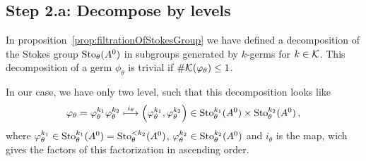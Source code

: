 \subsection{Step 2.a: Decompose by levels}
In proposition~\ref{prop:filtrationOfStokesGroup} we have defined a
decomposition of the Stokes group $\operatorname{Sto}_\theta(A^0)$ in subgroups generated by
$k$-germs for $k\in\mathcal{K}$.
This decomposition of a germ $\phi_\theta$ is trivial if
$\#\mathcal{K}(\varphi_\theta)\leq1$.

In our case, we have only two level, such that this decomposition looks like
\[
  \varphi_\theta=\varphi_\theta^{k_1} \varphi_\theta^{k_2}
  \overset{i_\theta}\longmapsto
    \left(\varphi_\theta^{k_1},\varphi_\theta^{k_2}\right)
      \in\operatorname{Sto}_\theta^{k_1}(A^0)\times\operatorname{Sto}_\theta^{k_2}(A^0) \,,
\]
where $\varphi_\theta^{k_1}\in\operatorname{Sto}_\theta^{k_1}(A^0)=\operatorname{Sto}_\theta^{<k_2}(A^0)$,
$\varphi_\theta^{k_2}\in\operatorname{Sto}_\theta^{k_2}(A^0)$  and $i_\theta$ is the map, wich
gives the factors of this factorization in ascending order.

